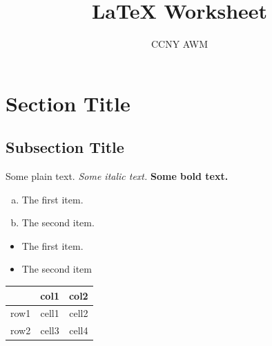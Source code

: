 \documentclass[11pt, reqno]{amsart}
\theoremstyle{plain}
\theoremstyle{definition}
\theoremstyle{example}
\begin{document}
\title{LaTeX Worksheet}
\author{CCNY AWM}
\maketitle

\section{Section Title}
\subsection{Subsection Title}
Some plain text. 
\textit{Some italic text.}
\textbf{Some bold text.}

\begin{enumerate}[a)]
	\item The first item.
	\item The second item.
\end{enumerate}

\begin{itemize}
	\item The first item. 
	\item The second item
\end{itemize}

\begin{center}
	\begin{tabular}{ | c || c | c | } \hline
			 & col1  & col2  \\ \hline \hline
		row1 & cell1 & cell2 \\ \hline 
		row2 & cell3 & cell4 \\ \hline
	\end{tabular}
\end{center}

\end{document}
